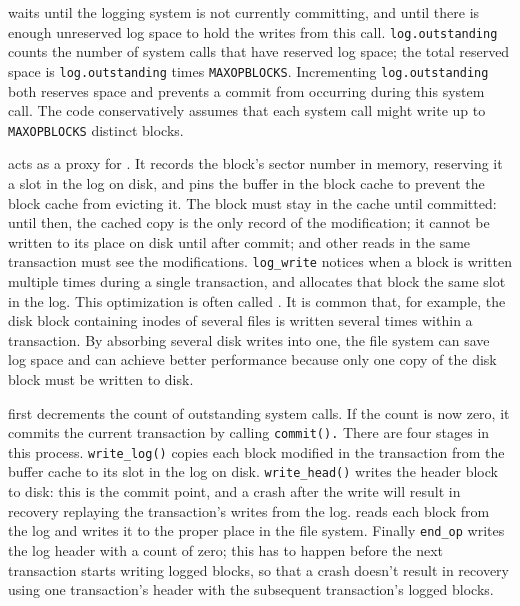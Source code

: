 waits until
the logging system is not currently committing, and until
there is enough unreserved log space to hold
the writes from this call.
\lstinline{log.outstanding}
counts the number of system calls that have reserved log
space; the total reserved space is 
\lstinline{log.outstanding}
times
\lstinline{MAXOPBLOCKS}.
Incrementing
\lstinline{log.outstanding}
both reserves space and prevents a commit
from occurring during this system call.
The code conservatively assumes that each system call might write up to
\lstinline{MAXOPBLOCKS}
distinct blocks.

acts as a proxy for 
.
It records the block's sector number in memory,
reserving it a slot in the log on disk,
and pins the buffer in the block cache
to prevent the block cache from evicting it.
The block must stay in the cache until committed:
until then, the cached copy is the only record
of the modification; it cannot be written to
its place on disk until after commit;
and other reads in the same transaction must
see the modifications.
\lstinline{log_write}
notices when a block is written multiple times during a single
transaction, and allocates that block the same slot in the log.
This optimization is often called
.
It is common that, for example, the disk block containing inodes
of several files is written several times within a transaction.  By absorbing
several disk writes into one, the file system can save log space and
can achieve better performance because only one copy of the disk block must be
written to disk.

first decrements the count of outstanding system calls.
If the count is now zero, it commits the current
transaction by calling
\lstinline{commit().}
There are four stages in this process.
\lstinline{write_log()}
copies each block modified in the transaction from the buffer
cache to its slot in the log on disk.
\lstinline{write_head()}
writes the header block to disk: this is the
commit point, and a crash after the write will
result in recovery replaying the transaction's writes from the log.
reads each block from the log and writes it to the proper
place in the file system.
Finally
\lstinline{end_op}
writes the log header with a count of zero;
this has to happen before the next transaction starts writing
logged blocks, so that a crash doesn't result in recovery
using one transaction's header with the subsequent transaction's
logged blocks.

